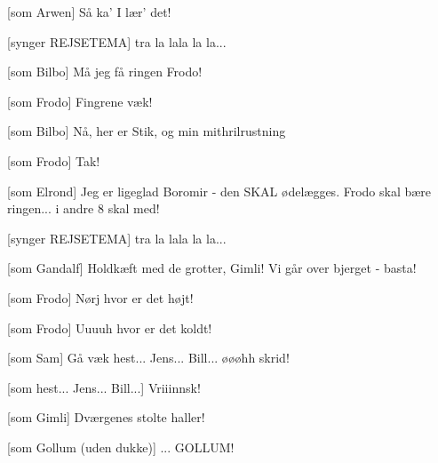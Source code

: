 \documentclass[a4paper,11pt]{article}
\begin{document}
\begin{sketch}
  
   
  
  [som Arwen] Så ka' I lær' det!
  
   [synger REJSETEMA] tra la lala la la...
	

  
  
  [som Bilbo] Må jeg få ringen Frodo!
  
  [som Frodo] Fingrene væk!
  
  [som Bilbo] Nå, her er Stik, og min mithrilrustning
  
  [som Frodo] Tak!

  
  
  [som Elrond] Jeg er ligeglad Boromir - den SKAL
  ødelægges. Frodo skal bære ringen... i andre 8 skal med!
  
   
  
  
   [synger REJSETEMA] tra la lala la la...
  

  [som Gandalf] Holdkæft med de grotter, Gimli! Vi går over
  bjerget - basta!
  
  [som Frodo] Nørj hvor er det højt!
  
  
  [som Frodo] Uuuuh hvor er det koldt!
  
  
  [som Sam] Gå væk hest... Jens... Bill...  øøøhh skrid!

  [som hest... Jens... Bill...] Vriiinnsk!
  
  [som Gimli] Dværgenes stolte haller!
  
  [som Gollum (uden dukke)] ... GOLLUM!
  

\end{sketch}
\end{document}
